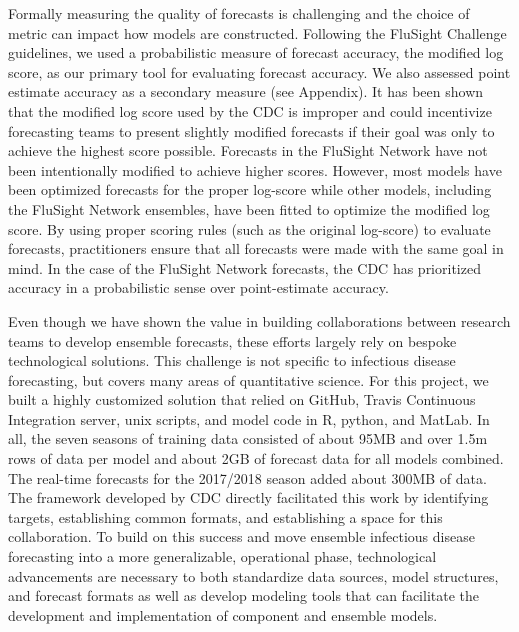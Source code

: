 \documentclass{article}\usepackage[]{graphicx}\usepackage[]{color}
\begin{document}
Formally measuring the quality of forecasts is challenging and the choice of metric can impact how models are constructed.
Following the FluSight Challenge guidelines, we used a probabilistic measure of forecast accuracy, the modified log score, as our primary tool for evaluating forecast accuracy.
We also assessed point estimate accuracy as a secondary measure (see Appendix). 
It has been shown that the modified log score used by the CDC is improper and could incentivize forecasting teams to present slightly modified forecasts if their goal was only to achieve the highest score possible.\cite{Gneiting2007,bracher2019score}
Forecasts in the FluSight Network have not been intentionally modified to achieve higher scores.\cite{reich2019reply} 
However, most models have been optimized forecasts for the proper log-score while other models, including the FluSight Network ensembles, have been fitted to optimize the modified log score. 
By using proper scoring rules (such as the original log-score) to evaluate forecasts, practitioners ensure that all forecasts were made with the same goal in mind. 
In the case of the FluSight Network forecasts, the CDC has prioritized accuracy in a probabilistic sense over point-estimate accuracy.

Even though we have shown the value in building collaborations between research teams to develop ensemble forecasts, these efforts largely rely on bespoke technological solutions.
This challenge is not specific to infectious disease forecasting, but covers many areas of quantitative science.
For this project, we built a highly customized solution that relied on GitHub, Travis Continuous Integration server, unix scripts, and model code in R, python, and MatLab. 
In all, the seven seasons of training data consisted of about 95MB and over 1.5m rows of data per model and about 2GB of forecast data for all models combined.
The real-time forecasts for the 2017/2018 season added about 300MB of data.
The framework developed by CDC directly facilitated this work by identifying targets, establishing common formats, and establishing a space for this collaboration. To build on this success
and move ensemble infectious disease forecasting into a more generalizable, operational phase, technological advancements are necessary to both standardize data sources, model structures, and forecast formats as well as develop modeling tools that can facilitate the development and implementation of component and ensemble models.
\end{document}
